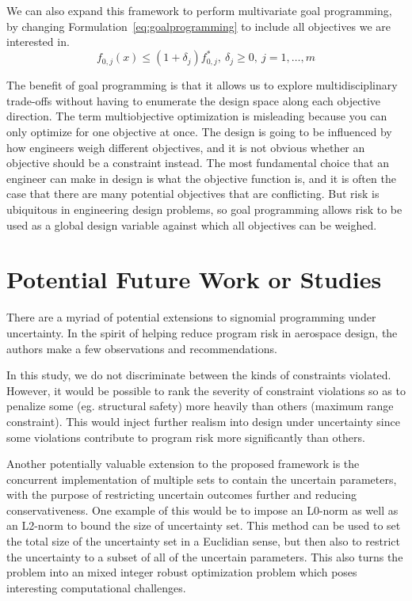 We can also expand this framework to perform multivariate goal programming,
by changing Formulation~\ref{eq:goalprogramming} to include all
objectives we are interested in.
\begin{equation}
    f_{0,j}(x) \leq (1+\delta_j) f^*_{0,j},~\delta_j \geq 0,~j = 1,\ldots, m
    \label{eq:multigoal}
\end{equation}

The benefit of goal programming is that it allows us to explore multidisciplinary trade-offs without
having to enumerate the design space along each objective direction.
The term multiobjective optimization is misleading
because you can only optimize for one objective at once.
The design is going to be influenced by how engineers weigh different objectives, and
it is not obvious whether an objective should be a constraint instead. The most
fundamental choice that an engineer can make in design is what the objective function is, and it is
often the case that there are many potential objectives that are conflicting.
But risk is ubiquitous in engineering design problems, so goal programming allows risk to be used as
a global design variable against which all objectives can be weighed.

\section{Potential Future Work or Studies}

There are a myriad of potential extensions to signomial programming under uncertainty.
In the spirit of helping reduce program risk in aerospace design,
the authors make a few observations and recommendations.

In this study, we do not discriminate between the kinds of constraints violated. However, it would
be possible to rank the severity of constraint violations so as to penalize some (eg. structural safety)
more heavily than others (maximum range constraint). This would inject further realism into
design under uncertainty since some violations contribute to program risk more
significantly than others.

Another potentially valuable extension to the proposed framework is the concurrent implementation
of multiple sets to contain the uncertain parameters, with the purpose of restricting uncertain
outcomes further and reducing conservativeness.
One example of this would be to impose an L0-norm as well as an L2-norm
to bound the size of uncertainty set.
This method can be used to set the total size of the uncertainty set in a Euclidian sense,
but then also to restrict the uncertainty to a subset of all of the uncertain parameters.
This also turns the problem into an mixed integer robust
optimization problem which poses interesting computational challenges.

